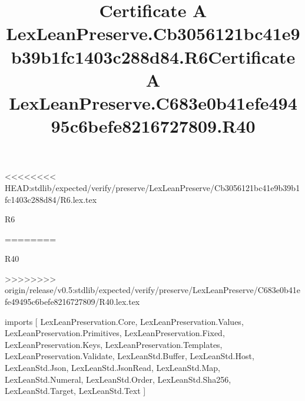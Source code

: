 <<<<<<<< HEAD:stdlib/expected/verify/preserve/LexLeanPreserve/Cb3056121bc41e9b39b1fc1403c288d84/R6.lex.tex
\begin{lexlean}{R6}
\title{Certificate A LexLeanPreserve.Cb3056121bc41e9b39b1fc1403c288d84.R6}
========
\begin{lexlean}{R40}
\title{Certificate A LexLeanPreserve.C683e0b41efe49495c6befe8216727809.R40}
>>>>>>>> origin/release/v0.5:stdlib/expected/verify/preserve/LexLeanPreserve/C683e0b41efe49495c6befe8216727809/R40.lex.tex
\begin{coremodule}
imports [
  LexLeanPreservation.Core,
  LexLeanPreservation.Values,
  LexLeanPreservation.Primitives,
  LexLeanPreservation.Fixed,
  LexLeanPreservation.Keys,
  LexLeanPreservation.Templates,
  LexLeanPreservation.Validate,
  LexLeanStd.Buffer,
  LexLeanStd.Host,
  LexLeanStd.Json,
  LexLeanStd.JsonRead,
  LexLeanStd.Map,
  LexLeanStd.Numeral,
  LexLeanStd.Order,
  LexLeanStd.Sha256,
  LexLeanStd.Target,
  LexLeanStd.Text
]


\end{coremodule}
\end{lexlean}
\end{lexlean}

